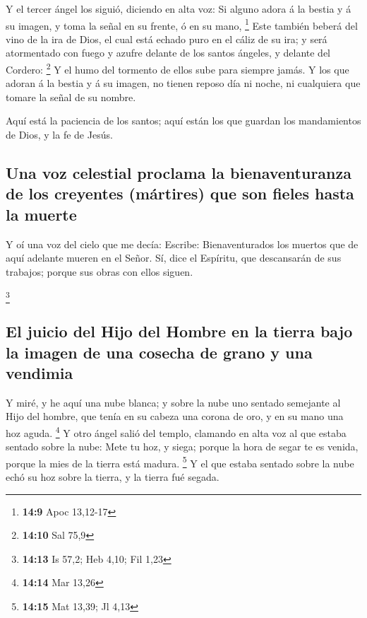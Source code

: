  Y el tercer ángel los siguió, diciendo en alta voz: Si
alguno adora á la bestia y á su imagen, y toma la señal en su frente, ó
en su mano, \footnote{\textbf{14:9} Apoc 13,12-17}  Este
también beberá del vino de la ira de Dios, el cual está echado puro en
el cáliz de su ira; y será atormentado con fuego y azufre delante de los
santos ángeles, y delante del Cordero: \footnote{\textbf{14:10} Sal 75,9}
 Y el humo del tormento de ellos sube para siempre jamás.
Y los que adoran á la bestia y á su imagen, no tienen reposo día ni
noche, ni cualquiera que tomare la señal de su nombre.

 Aquí está la paciencia de los santos; aquí están los que
guardan los mandamientos de Dios, y la fe de Jesús.

\hypertarget{una-voz-celestial-proclama-la-bienaventuranza-de-los-creyentes-muxe1rtires-que-son-fieles-hasta-la-muerte}{%
\subsection{Una voz celestial proclama la bienaventuranza de los
creyentes (mártires) que son fieles hasta la
muerte}\label{una-voz-celestial-proclama-la-bienaventuranza-de-los-creyentes-muxe1rtires-que-son-fieles-hasta-la-muerte}}

 Y oí una voz del cielo que me decía: Escribe:
Bienaventurados los muertos que de aquí adelante mueren en el Señor. Sí,
dice el Espíritu, que descansarán de sus trabajos; porque sus obras con
ellos siguen.

\footnote{\textbf{14:13} Is 57,2; Heb 4,10; Fil 1,23}

\hypertarget{el-juicio-del-hijo-del-hombre-en-la-tierra-bajo-la-imagen-de-una-cosecha-de-grano-y-una-vendimia}{%
\subsection{El juicio del Hijo del Hombre en la tierra bajo la imagen de
una cosecha de grano y una
vendimia}\label{el-juicio-del-hijo-del-hombre-en-la-tierra-bajo-la-imagen-de-una-cosecha-de-grano-y-una-vendimia}}

 Y miré, y he aquí una nube blanca; y sobre la nube uno
sentado semejante al Hijo del hombre, que tenía en su cabeza una corona
de oro, y en su mano una hoz aguda. \footnote{\textbf{14:14} Mar 13,26}
 Y otro ángel salió del templo, clamando en alta voz al
que estaba sentado sobre la nube: Mete tu hoz, y siega; porque la hora
de segar te es venida, porque la mies de la tierra está madura.
\footnote{\textbf{14:15} Mat 13,39; Jl 4,13}  Y el que
estaba sentado sobre la nube echó su hoz sobre la tierra, y la tierra
fué segada.

